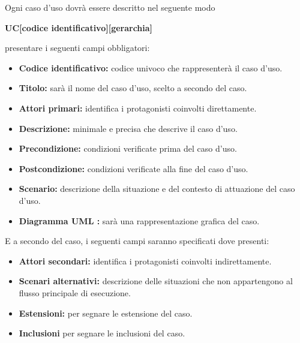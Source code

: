 \documentclass[a4paper,11pt]{article}
\begin{document}
			Ogni caso d'uso dovrà essere descritto nel seguente modo
			\begin{center}
						\textbf{ UC[codice identificativo][gerarchia]}		
					
			\end{center}
			 presentare i seguenti campi obbligatori:
			\begin{itemize}
			\item \textbf{Codice identificativo:} codice univoco che rappresenterà il caso d'uso. 
			\item \textbf{Titolo:} sarà il nome del caso d'uso, scelto a secondo del caso.
			\item \textbf{Attori primari:} identifica i protagonisti coinvolti direttamente.
			\item \textbf{Descrizione:} minimale e precisa che descrive il caso d'uso.
			\item \textbf{Precondizione:} condizioni verificate prima del caso d'uso.
			\item \textbf{Postcondizione:} condizioni verificate alla fine del caso d'uso.
			\item \textbf{Scenario:} descrizione della situazione e del contesto di attuazione del caso d'uso.
			\item \textbf{Diagramma UML :} sarà una rappresentazione grafica del caso.
			\end{itemize}
			E a secondo del caso, i seguenti campi saranno specificati dove presenti:
			\begin{itemize}
			\item \textbf{Attori secondari:} identifica i protagonisti coinvolti indirettamente.
			\item \textbf{Scenari alternativi:} descrizione delle situazioni che non appartengono al flusso principale di esecuzione.
			\item \textbf{Estensioni:} per segnare le estensione del caso. 
			\item \textbf{Inclusioni}  per segnare le inclusioni del caso.
			\end{itemize}
							
\end{document}
